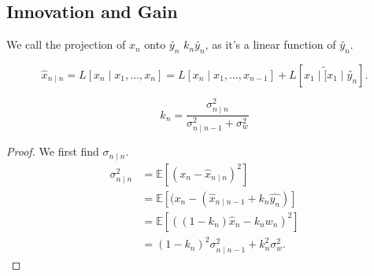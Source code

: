 \documentclass{article}
\newcommand{\EE}{\mathbb{E}}
\begin{document}
\subsection{Innovation and Gain}
We call the projection of $x_n$ onto $\tilde{y_n}$ $k_n \tilde{y_n}$, as it's a linear function of $\tilde{y_n}$.

\[\hat{x}_{n \mid n} = L[x_n \mid x_1, \ldots, x_n] = L[x_n \mid x_1, \ldots, x_{n-1}] + L[x_1 \mid \tilde[x_1 \mid \tilde{y_n}].\]

\begin{definition} 
	\[k_n = \frac{\sigma^2_{n \mid n}}{\sigma^2_{n \mid n-1} + \sigma^2_{w}}\]
\end{definition}

\begin{proof}
	We first find $\sigma_{n \mid n}$.
	\begin{align*}
		\sigma^2_{n \mid n} &= \EE[(x_n - \hat{x}_{n \mid n})^2] \\
							&= \EE[(x_n - (\hat{x}_{n \mid n-1} + k_n \hat{y_n})] \\
							&= \EE[((1 - k_n) \hat{x}_n - k_n w_n)^2] \\
							&= (1 - k_n)^2 \sigma^2_{n \mid n-1} + k_n^2 \sigma^2_{w}.
	\end{align*}
\end{proof}
\end{document}
